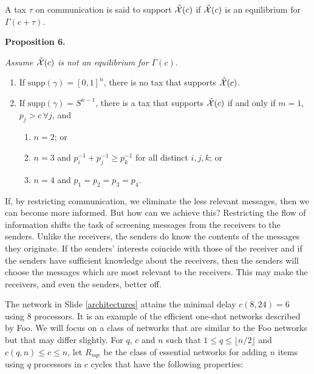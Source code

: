 \begin{slide}\label{akbar}\def\slidefuzz{15pt}
  {\large A tax $\tau$ on communication is said to support
$\tilde{\cal{X}}(c)$ if $\tilde{\cal{X}}(c)$ is an equilibrium for
$\Gamma(c+\tau)$.}
\medskip

 {\bf Proposition 6.} {\em Assume $\tilde{\cal{X}}(c)$ is not an equilibrium
for $\Gamma(c)$.\vspace{-3pt}
\begin{enumerate}
 \item If $\mbox{supp}(\gamma)=[0,1]^n$, there is no tax that supports
$\tilde{\cal{X}}(c)$.
 \item If $\mbox{supp}(\gamma)=S^{n-1}$, there is a tax that supports
$\tilde{\cal{X}}(c)$ if and only if $m=1$, $p_j>c\, \forall j$, and
   \begin{enumerate}
     \item $n=2$; or
     \item $n=3$ and $p_i^{-1}+p_j^{-1}\geq p_k^{-1}$ for all distinct
$i,j,k$; or
     \item $n=4$ and $p_1=p_2=p_3=p_4$.
\end{enumerate}
\end{enumerate}}
\end{slide}

  If, by restricting communication, we eliminate the less relevant messages,
then we can become more informed. But how can we achieve this? Restricting the
flow of information shifts the task of screening messages from the receivers
to the senders. Unlike the receivers, the senders do know the contents of the
messages they originate. If the senders' interests coincide with those of the
receiver and if the senders have sufficient knowledge about the receivers,
then the senders will choose the messages which are most relevant to the
receivers. This may make the receivers, and even the senders, better off.

  The network in Slide \ref{architectures} attains the minimal delay $c(8,24)
= 6$ using 8 processors. It is an example of the efficient one-shot networks
described by Foo. We will focus on a class of networks that are similar to the
Foo networks but that may differ slightly. For $q$, $c$ and $n$ such that $1
\leq q \leq \lfloor n/2 \rfloor$ and $c(q,n) \leq c \leq n$, let $R_{nqc}$ be
the class of essential networks for adding $n$ items using  $q$ processors in
$c$ cycles that have the following  properties:

